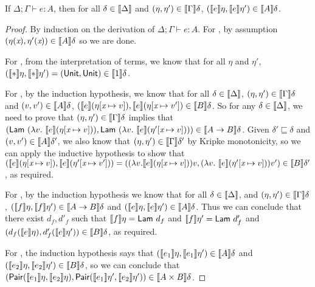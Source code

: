 \begin{theorem}\label{thm:semantic-soundness}
  If $\Delta; \Gamma \vdash e : A$, then for all $\delta \in
  \llbracket \Delta \rrbracket$ and $(\eta,\eta') \in \llbracket \Gamma \rrbracket\delta$,
  $(\llbracket e \rrbracket\eta,\llbracket e \rrbracket\eta') \in \llbracket A \rrbracket\delta$.
\end{theorem}

\begin{proof}
  By induction on the derivation of $\Delta; \Gamma \vdash e : A$. For
  , by assumption $(\eta(\textit{x}),\eta'(\textit{x})) \in
  \llbracket A \rrbracket\delta$ so we are done.

  For , from the interpretation of terms, we know that
  for all $\eta$ and $\eta'$, $(\llbracket * \rrbracket\eta, \llbracket * \rrbracket\eta') =
  (\mathsf{Unit}, \mathsf{Unit}) \in \llbracket 1 \rrbracket\delta$.

  For , by the induction hypothesis, we know that for all
  $\delta \in \llbracket \Delta \rrbracket$, $(\eta,\eta') \in \llbracket \Gamma \rrbracket\delta$ and
  $(v,v') \in \llbracket A \rrbracket\delta$, $(\llbracket e \rrbracket(\eta[\textit{x} \mapsto v]),
  \llbracket e \rrbracket(\eta[\textit{x} \mapsto v']) \in \llbracket B \rrbracket\delta$. So for any
  $\delta \in \llbracket \Delta \rrbracket$, we need to prove that $(\eta,\eta') \in
  \llbracket \Gamma \rrbracket\delta$ implies that $(\mathsf{Lam}\ (\lambda v.\
  \llbracket e \rrbracket(\eta[\textit{x} \mapsto v])), \mathsf{Lam}\ (\lambda v.\
  \llbracket e \rrbracket(\eta'[\textit{x} \mapsto v]))) \in \llbracket A \to
    B \rrbracket\delta$. Given $\delta' \sqsubseteq \delta$ and $(v,v') \in
  \llbracket A \rrbracket\delta'$, we also know that $(\eta,\eta') \in
  \llbracket \Gamma \rrbracket\delta'$ by Kripke monotonicity, so we can apply the
  inductive hypothesis to show that $(\llbracket e \rrbracket(\eta[\textit{x} \mapsto
  v]), \llbracket e \rrbracket(\eta'[\textit{x} \mapsto v'])) = ((\lambda
  v. \llbracket e \rrbracket(\eta[\textit{x} \mapsto v]))v, (\lambda v.\
  \llbracket e \rrbracket(\eta'[\textit{x} \mapsto v]))v') \in \llbracket B \rrbracket\delta'$, as
  required.

  For \TirName{App}, by the induction hypothesis we know that for all
  $\delta \in \llbracket \Delta \rrbracket$, and $(\eta, \eta') \in
  \llbracket \Gamma \rrbracket\delta$, $(\llbracket f \rrbracket\eta, \llbracket f \rrbracket\eta') \in \llbracket A \to
    B \rrbracket\delta$ and $(\llbracket e \rrbracket\eta, \llbracket e \rrbracket\eta') \in
  \llbracket A \rrbracket\delta$. Thus we can conclude that there exist $d_f, d'_f$
  such that $\sem{f}\eta = \semCons{Lam}\ d_f$ and $\llbracket f \rrbracket\eta' =
  \mathsf{Lam}\ d'_f$ and $(d_f(\llbracket e \rrbracket\eta), d'_f(\llbracket e \rrbracket\eta')) \in
  \llbracket B \rrbracket\delta$, as required.

  For \TirName{Pair}, the induction hypothesis says that
  $(\llbracket e_1 \rrbracket\eta, \llbracket e_1 \rrbracket\eta') \in \llbracket A \rrbracket\delta$ and
  $(\llbracket e_2 \rrbracket\eta, \llbracket e_2 \rrbracket\eta') \in \llbracket B \rrbracket\delta$, so we can conclude
  that $(\mathsf{Pair}(\llbracket e_1 \rrbracket\eta, \llbracket e_2 \rrbracket\eta),
  \mathsf{Pair}(\llbracket e_1 \rrbracket\eta', \llbracket e_2 \rrbracket\eta')) \in \llbracket A \times
    B \rrbracket\delta$.


\end{proof}
